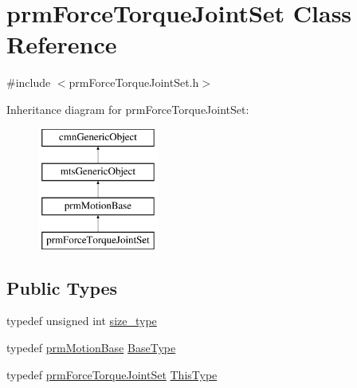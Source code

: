 \hypertarget{classprm_force_torque_joint_set}{}\section{prm\+Force\+Torque\+Joint\+Set Class Reference}
\label{classprm_force_torque_joint_set}


{\ttfamily \#include $<$prm\+Force\+Torque\+Joint\+Set.\+h$>$}

Inheritance diagram for prm\+Force\+Torque\+Joint\+Set\+:\begin{figure}[H]
\begin{center}
\leavevmode
\includegraphics[height=4.000000cm]{da/d22/classprm_force_torque_joint_set}
\end{center}
\end{figure}
\subsection*{Public Types}
\begin{DoxyCompactItemize}
\item 
typedef unsigned int \hyperlink{classprm_force_torque_joint_set_a2fa9d363f410074de832a3f627f3b43b}{size\+\_\+type}
\item 
typedef \hyperlink{classprm_motion_base}{prm\+Motion\+Base} \hyperlink{classprm_force_torque_joint_set_a5381a0507902adc394509c016450ad79}{Base\+Type}
\item 
typedef \hyperlink{classprm_force_torque_joint_set}{prm\+Force\+Torque\+Joint\+Set} \hyperlink{classprm_force_torque_joint_set_a18867cb10dfae15004f3c72b30481f20}{This\+Type}
\end{DoxyCompactItemize}
